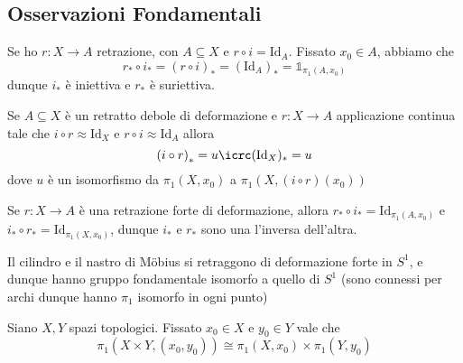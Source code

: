     \subsection{Osservazioni Fondamentali}
\begin{proposition}
    Se ho \(r : X \to A\) retrazione, con \(A \subseteq X \) e \(r \circ i =
    \mathrm{Id}_A\). Fissato \(x_{0} \in A\), abbiamo che
    \[
      r_* \circ i_* = {(r \circ i)}_* = (\mathrm{Id}_A)_* =
      \mathbb{1}_{\pi_{1}{(A, x_{0})}}
    \]
    dunque \(i_*\) è iniettiva e \(r_*\) è suriettiva.
\end{proposition}
\begin{proposition}
    Se \(A \subseteq X \) è un retratto debole di deformazione e \(r : X \to A\)
    applicazione continua tale che \(i \circ r \approx \mathrm{Id}_X\) e \(r
    \circ i \approx \mathrm{Id}_A\) allora
    \[
      {(i \circ r)}_* = u \icrc (\mathrm{Id}_X)_* = u 
    \]
    dove \(u\) è un isomorfismo da \(\pi_{1}{(X, x_{0})}\) a \(\pi_{1}{(X, (i
    \circ r){(x_{0})})}\) 
\end{proposition}
\begin{proposition}
    Se \(r : X \to A\) è una retrazione forte di deformazione, allora \(r_*
    \circ i_* = \mathrm{Id}_{\pi_{1}{(A, x_{0})}} \) e \(i_* \circ r_* =
    \mathrm{Id}_{\pi_{1}{(X, x_{0})}} \), dunque \(i_*\) e \(r_*\) sono una
    l'inversa dell'altra.
\end{proposition}
\begin{example}
    Il cilindro e il nastro di Möbius si retraggono di deformazione forte in
    \(S^{1}\), e dunque hanno gruppo fondamentale isomorfo a quello di \(S^{1}\)
    (sono connessi per archi dunque hanno \(\pi_{1}\) isomorfo in ogni punto)
\end{example}
\begin{theorem}
    Siano \(X, Y\) spazi topologici. Fissato \(x_{0} \in X\) e \(y_{0} \in Y\)
    vale che 
    \[
      \pi_{1}{(X \times Y, {(x_{0}, y_{0})})} \cong \pi_{1}{(X, x_{0})} \times
      \pi_{1}{(Y, y_{0})}
    \]
\end{theorem}
